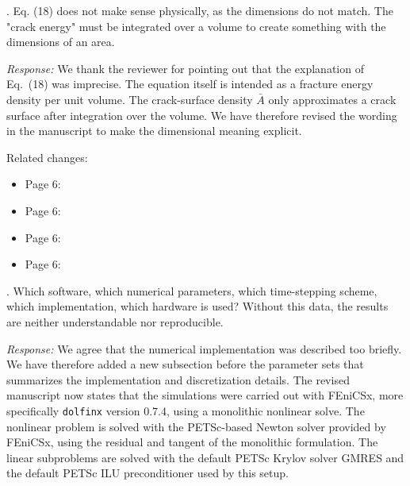 \documentclass[pdflatex,sn-mathphys-num]{sn-jnl}
\begin{document}
\bigskip

. Eq. (18) does not make sense physically, as the dimensions do not match. The "crack energy" must be integrated over a volume to create something with the dimensions of an area.

\emph{Response:} We thank the reviewer for pointing out that the explanation of Eq.~(18) was imprecise. The equation itself is intended as a fracture energy density per unit volume. The crack-surface density $\bar{A}$ only approximates a crack surface after integration over the volume. We have therefore revised the wording in the manuscript to make the dimensional meaning explicit.

Related changes:
\begin{itemize}
\item Page 6: 
\item Page 6: 
\item Page 6: 
\item Page 6: 
\end{itemize}

\bigskip

. Which software, which numerical parameters, which time-stepping scheme, which implementation, which hardware is used? Without this data, the results are neither understandable nor reproducible.

\emph{Response:} We agree that the numerical implementation was described too briefly. We have therefore added a new subsection before the parameter sets that summarizes the implementation and discretization details. The revised manuscript now states that the simulations were carried out with FEniCSx, more specifically \texttt{dolfinx} version 0.7.4, using a monolithic nonlinear solve. The nonlinear problem is solved with the PETSc-based Newton solver provided by FEniCSx, using the residual and tangent of the monolithic formulation. The linear subproblems are solved with the default PETSc Krylov solver GMRES and the default PETSc ILU preconditioner used by this setup.
\end{document}
